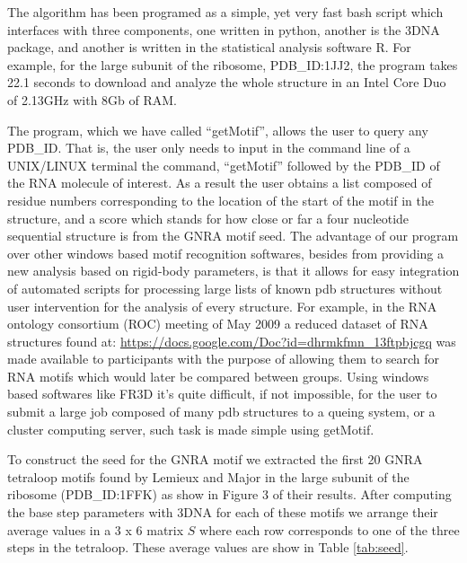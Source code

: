 The  algorithm has  been programed  as a  simple, yet  very  fast bash
script which interfaces with  three components, one written in python,
another is the 3DNA package, and another is written in the statistical
analysis  software R.   For  example,  for the  large  subunit of  the
ribosome, PDB\_ID:1JJ2, the program  takes 22.1 seconds to download and
analyze the whole  structure in an Intel Core Duo  of 2.13GHz with 8Gb
of RAM.

The  program, which  we have  called ``getMotif'',  allows the  user to
query any PDB\_ID. That is, the user only needs to input in the command
line of a UNIX/LINUX terminal the command, ``getMotif'' followed by the
PDB\_ID of the RNA molecule of interest. As a result the user obtains a
list composed of residue numbers  corresponding to the location of the
start of the motif in the  structure, and a score which stands for how
close or far  a four nucleotide sequential structure  is from the GNRA
motif seed.   The advantage  of our program  over other  windows based
motif  recognition softwares,  besides from  providing a  new analysis
based on rigid-body parameters, is that it allows for easy integration
of  automated  scripts  for   processing  large  lists  of  known  pdb
structures  without  user  intervention   for  the  analysis  of  every
structure. For  example, in the RNA ontology  consortium (ROC) meeting
of  May  2009   a  reduced  dataset  of  RNA   structures  found  at:
\url{https://docs.google.com/Doc?id=dhrmkfmn_13ftpbjcgq}    was   made
available to participants with the  purpose of allowing them to search
for RNA  motifs which  would later be  compared between  groups. Using
windows  based  softwares   like  FR3D  \cite{sarver2008}  it's  quite
difficult,  if not  impossible, for  the user  to submit  a  large job
composed  of many  pdb structures  to a  queing system,  or  a cluster
computing server, such task is made simple using getMotif.

To construct  the seed for  the GNRA motif  we extracted the  first 20
GNRA tetraloop motifs found by Lemieux and Major \cite{lemieux2006} in
the large subunit of the ribosome (PDB\_ID:1FFK) as show in Figure 3 of
their results. After computing the  base step parameters with 3DNA for
each of these motifs we arrange their average values in a 3 x 6
matrix $S$ where each row corresponds to one of the three steps in the
tetraloop. These average values are show in Table \ref{tab:seed}.

